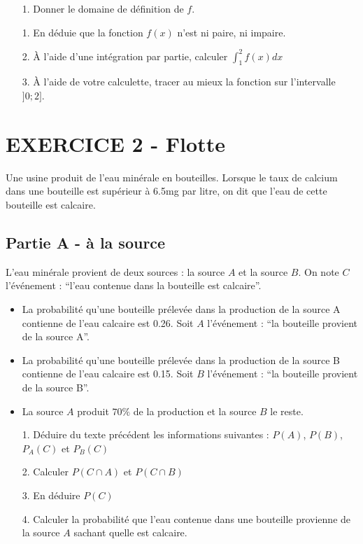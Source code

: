 \documentclass[12pt]{article}
\begin{document}
\begin{enumerate}
\item[1.] Donner le domaine de définition de $f$.
\item[1.] En déduie que la fonction $f(x)$ n'est ni paire, ni impaire.
\item[2.] À l'aide d'une intégration par partie, calculer $\int_{1}^{2} f(x) dx$
\item[3.] À l'aide de votre calculette, tracer au mieux la fonction sur l'intervalle $]0 ; 2]$.
\end{enumerate}

\begin{figure}[H]
  \centering
\end{figure}

\newpage
\section*{EXERCICE 2 - Flotte} %
Une usine produit de l'eau minérale en bouteilles. Lorsque le taux de calcium  dans une bouteille est supérieur à 6.5mg par litre, on dit que l'eau de cette bouteille est calcaire.

\subsection*{Partie A - à la source}

L'eau minérale provient de deux sources : la source $A$ et la source $B$. On note $C$ l'événement : ``l'eau contenue dans la bouteille est calcaire''.

\begin{itemize}
\item La probabilité qu'une bouteille prélevée dans la production de la source A contienne de l'eau calcaire est 0.26. Soit $A$ l'événement : ``la bouteille provient de la source A''.
\item La probabilité qu'une bouteille prélevée dans la production de la source B contienne de l'eau calcaire est 0.15. Soit $B$ l'événement : ``la bouteille provient de la source B''.
\item La source $A$ produit $70\%$ de la production et la source $B$ le reste.
\end{itemize}

\begin{enumerate}
\item[1.]  Déduire du texte précédent les informations suivantes : $P(A)$, $P(B)$,  $P_A(C)$ et  $P_B(C)$
\item[2.] Calculer $P(C \cap A)$ et $P(C \cap B)$
\item[3.] En déduire $P(C)$
\item[4.] Calculer la probabilité que l'eau contenue dans une bouteille provienne de la source $A$ sachant quelle est calcaire.
\end{enumerate}
\end{document}
